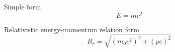 \documentclass[a4paper]{article}
\begin{document}
Simple form
$$E=mc^2$$

Relativistic  energy-momentum relation form
\begin{equation}
R_r = \sqrt{\left( m_0c^2 \right)^2 + \left( pc \right)^2}
\end{equation}
\end{document}
